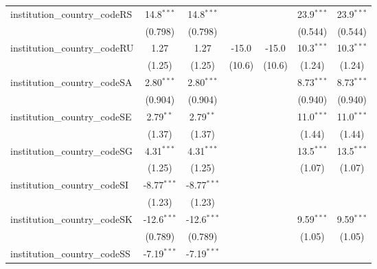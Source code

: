 \begin{tabular}{lcccccc}
   institution\_country\_codeRS          & 14.8$^{***}$   & 14.8$^{***}$   &               &               & 23.9$^{***}$  & 23.9$^{***}$\\   
                                         & (0.798)        & (0.798)        &               &               & (0.544)       & (0.544)\\   
   institution\_country\_codeRU          & 1.27           & 1.27           & -15.0         & -15.0         & 10.3$^{***}$  & 10.3$^{***}$\\   
                                         & (1.25)         & (1.25)         & (10.6)        & (10.6)        & (1.24)        & (1.24)\\   
   institution\_country\_codeSA          & 2.80$^{***}$   & 2.80$^{***}$   &               &               & 8.73$^{***}$  & 8.73$^{***}$\\   
                                         & (0.904)        & (0.904)        &               &               & (0.940)       & (0.940)\\   
   institution\_country\_codeSE          & 2.79$^{**}$    & 2.79$^{**}$    &               &               & 11.0$^{***}$  & 11.0$^{***}$\\   
                                         & (1.37)         & (1.37)         &               &               & (1.44)        & (1.44)\\   
   institution\_country\_codeSG          & 4.31$^{***}$   & 4.31$^{***}$   &               &               & 13.5$^{***}$  & 13.5$^{***}$\\   
                                         & (1.25)         & (1.25)         &               &               & (1.07)        & (1.07)\\   
   institution\_country\_codeSI          & -8.77$^{***}$  & -8.77$^{***}$  &               &               &               &   \\   
                                         & (1.23)         & (1.23)         &               &               &               &   \\   
   institution\_country\_codeSK          & -12.6$^{***}$  & -12.6$^{***}$  &               &               & 9.59$^{***}$  & 9.59$^{***}$\\   
                                         & (0.789)        & (0.789)        &               &               & (1.05)        & (1.05)\\   
   institution\_country\_codeSS          & -7.19$^{***}$  & -7.19$^{***}$  &               &               &               &   \\   

\end{tabular}
